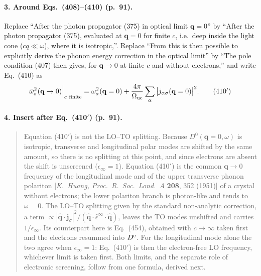 \paragraph{3. Around Eqs.~(408)--(410) (p.~91).}
Replace ``After the photon propagator (375) in optical limit $\mathbf q=0$'' by ``After the photon
propagator (375), evaluated at $\mathbf q=0$ for finite $c$, i.e.\ deep inside the light cone
($cq\ll\omega$), where it is isotropic,''. Replace ``From this is then possible to explicitly
derive the phonon energy correction in the optical limit'' by ``The pole condition (407) then
gives, for $\mathbf q\to0$ at finite $c$ and without electrons,'' and write Eq.~(410) as
\begin{equation*}
\tilde\omega^2_\sigma(\mathbf q\to0)\Big|_{c\ \text{finite}}
=\omega^2_\sigma(\mathbf q=0)+\frac{4\pi}{\Omega_{\rm uc}}\sum_\alpha\big|j_{\alpha\sigma}(\mathbf q=0)\big|^2 .
\tag{410$'$}
\end{equation*}

\paragraph{4. Insert after Eq.~(410$'$) (p.~91).}
\begin{quote}
Equation (410$'$) is not the LO--TO splitting. Because $D^0(\mathbf q=0,\omega)$ is isotropic,
transverse and longitudinal polar modes are shifted by the same amount, so there is no splitting
at this point, and since electrons are absent the shift is unscreened ($\epsilon_\infty=1$).
Equation (410$'$) is the common $\mathbf q\to0$ frequency of the longitudinal mode and of the
upper transverse phonon polariton [\textit{K.~Huang, Proc.\ R.\ Soc.\ Lond.\ A} \textbf{208}, 352
(1951)] of a crystal without electrons; the lower polariton branch is photon-like and tends to
$\omega=0$. The LO--TO splitting given by the standard non-analytic correction, a term
$\propto|\hat{\mathbf q}\cdot\mathbf j_\sigma|^2/(\hat{\mathbf q}\cdot\hat\epsilon^\infty\cdot\hat{\mathbf q})$,
leaves the TO modes unshifted and carries $1/\epsilon_\infty$. Its counterpart here is Eq.~(454),
obtained with $c\to\infty$ taken first and the electrons resummed into $D^{\rm e}$. For the
longitudinal mode alone the two agree when $\epsilon_\infty=1$: Eq.~(410$'$) is then the
electron-free LO frequency, whichever limit is taken first. Both limits, and the separate role of
electronic screening, follow from one formula, derived next.
\end{quote}

